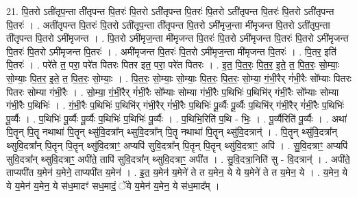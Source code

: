 \documentclass[17pt]{extarticle}
\begin{document}
21. पि॒तरो ऽती॑तृप॒न्ता ती॑तृपन्त पि॒तरः॑ पि॒तरो ऽती॑तृपन्त पि॒तरः॑ पि॒तरो ऽती॑तृपन्त पि॒तरः॑ 
पि॒तरो ऽती॑तृपन्त पि॒तरः॑ । . अती॑तृपन्त पि॒तरः॑ पि॒तरो ऽती॑तृप॒न्ता ती॑तृपन्त पि॒तरो ऽमी॑मृज॒न्ता मी॑मृजन्त पि॒तरो ऽती॑तृप॒न्ता ती॑तृपन्त पि॒तरो ऽमी॑मृजन्त । . पि॒तरो ऽमी॑मृज॒न्ता मी॑मृजन्त पि॒तरः॑ पि॒तरो ऽमी॑मृजन्त पि॒तरः॑ पि॒तरो ऽमी॑मृजन्त पि॒तरः॑ पि॒तरो ऽमी॑मृजन्त पि॒तरः॑ । . अमी॑मृजन्त पि॒तरः॑ पि॒तरो ऽमी॑मृज॒न्ता मी॑मृजन्त पि॒तरः॑ । . पि॒तर॒ इति॑ पि॒तरः॑ । . परे॑ते त॒ परा॒ परे॑त पितरः पितर इत॒ परा॒ परे॑त पितरः । . इ॒त॒ पि॒त॒रः॒ पि॒त॒र॒ इ॒ते॒ त॒ पि॒त॒रः॒ सो॒म्याः॒ सो॒म्याः॒ पि॒त॒र॒ इ॒ते॒ त॒ पि॒त॒रः॒ सो॒म्याः॒ । . पि॒त॒रः॒ सो॒म्याः॒ सो॒म्याः॒ पि॒त॒रः॒ पि॒त॒रः॒ सो॒म्या॒ गं॒भी॒रैर् गं॑भी॒रैः सो᳚म्याः पितरः पितरः सोम्या गंभी॒रैः । . सो॒म्या॒ गं॒भी॒रैर् गं॑भी॒रैः सो᳚म्याः सोम्या गंभी॒रैः प॒थिभिः॑ प॒थिभि॑र् गंभी॒रैः सो᳚म्याः सोम्या गंभी॒रैः प॒थिभिः॑ । . गं॒भी॒रैः प॒थिभिः॑ प॒थिभि॑र् गंभी॒रैर् गं॑भी॒रैः प॒थिभिः॑ पू॒र्व्यैः पू॒र्व्यैः प॒थिभि॑र् गंभी॒रैर् गं॑भी॒रैः प॒थिभिः॑ पू॒र्व्यैः । . प॒थिभिः॑ पू॒र्व्यैः पू॒र्व्यैः प॒थिभिः॑ प॒थिभिः॑ पू॒र्व्यैः । . प॒थिभि॒रिति॑ प॒थि - भिः॒ । . पू॒र्व्यैरिति॑ पू॒र्व्यैः । . अथा॑ पि॒तॄन् पि॒तॄ नथाथा॑ पि॒तॄन् थ्सु॑वि॒दत्रा᳚न् थ्सुवि॒दत्रा᳚न् पि॒तॄ नथाथा॑ पि॒तॄन् थ्सु॑वि॒दत्रान्॑ । . पि॒तॄन् थ्सु॑वि॒दत्रा᳚न् थ्सुवि॒दत्रा᳚न् पि॒तॄन् पि॒तॄन् थ्सु॑वि॒दत्राꣳ॒॒ अप्यपि॑ सुवि॒दत्रा᳚न् पि॒तॄन् पि॒तॄन् थ्सु॑वि॒दत्राꣳ॒॒ अपि॑ । . सु॒वि॒दत्राꣳ॒॒ अप्यपि॑ सुवि॒दत्रा᳚न् थ्सुवि॒दत्राꣳ॒॒ अपी॑ते॒ तापि॑ सुवि॒दत्रा᳚न् थ्सुवि॒दत्राꣳ॒॒ अपी॑त । . सु॒वि॒दत्रा॒निति॑ सु - वि॒दत्रान्॑ । . अपी॑ते॒ ताप्यपी॑त य॒मेन॑ य॒मेने॒ ताप्यपी॑त य॒मेन॑ । . इ॒त॒ य॒मेन॑ य॒मेने॑ ते त य॒मेन॒ ये ये य॒मेने॑ ते त य॒मेन॒ ये । . य॒मेन॒ ये ये य॒मेन॑ य॒मेन॒ ये स॑ध॒मादꣳ॑ सध॒मादं॒ ॅये य॒मेन॑ य॒मेन॒ ये स॑ध॒माद᳚म् । \newline
\end{document}
